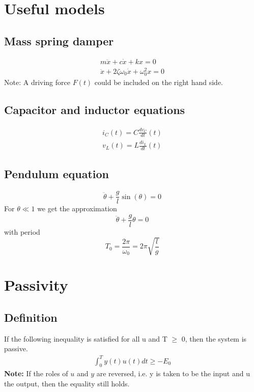 \section{Useful models}
\subsection{Mass spring damper}
\begin{align}
    m\ddot{x} + c\dot{x} + kx = 0\\
    \ddot{x} + 2\zeta \omega_0 \dot{x} + \omega_0^2 x = 0
\end{align}
Note: A driving force $F(t)$ could be included on the right hand side.

\subsection{Capacitor and inductor equations}
\begin{align}
    i_C(t) = C\frac{dv_C}{dt}(t)\\
    v_L(t) = L\frac{di_L}{dt}(t)
\end{align}

\subsection{Pendulum equation}
\begin{equation}
    \ddot{\theta} + \frac{g}{l} \sin(\theta) = 0
\end{equation}
For $\theta \ll 1$ we get the approximation
\begin{equation}
    \ddot{\theta} + \frac{g}{l}\theta = 0
\end{equation}
with period
\begin{equation}
    T_0 = \frac{2\pi}{\omega_0} = 2\pi \sqrt{\frac{l}{g}}
\end{equation}

\section{Passivity}
\subsection{Definition}
If the following inequality is satisfied for all u and T $\geq$ 0, then the system is passive.
\begin{align}
    \int_0^Ty(t)u(t)dt\geq -E_0
\end{align}
\textbf{Note:} If the roles of $u$ and $y$ are reversed, i.e. y is taken to be the input and u the output, then the equality still holds.

